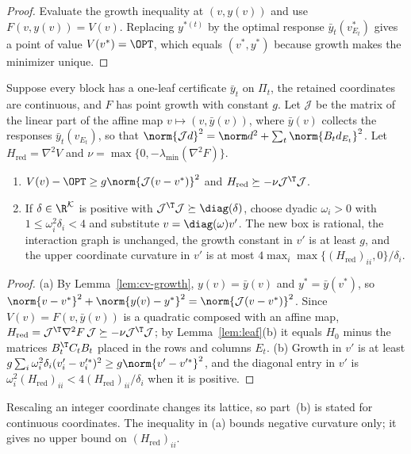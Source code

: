 \begin{proof}
Evaluate the growth inequality at $(v,y(v))$ and use $F(v,y(v))=V(v)$.
Replacing $y^{*(t)}$ by the optimal response $\bar y_t(v^*_{E_t})$ gives a
point of value $V(v^*)=\OPT$, which equals $(v^*,y^*)$ because growth makes
the minimizer unique.
\end{proof}

\begin{corollary}\label{cor:cv-affine}
Suppose every block has a one-leaf certificate $\bar y_t$ on $\Pi_t$, the
retained coordinates are continuous, and $F$ has point growth with
constant $g$. Let $\mathcal J$ be the matrix of the linear part of the affine
map $v\mapsto(v,\bar y(v))$, where $\bar y(v)$ collects the responses
$\bar y_t(v_{E_t})$, so that
$\norm{\mathcal Jd}^2=\norm d^2+\sum_t\norm{B_td_{E_t}}^2$. Let
$H_{\mathrm{red}}=\nabla^2V$ and $\nu=\max\{0,-\lambda_{\min}(\nabla^2F)\}$.
\begin{enumerate}
\item[(a)] $V(v)-\OPT\ge g\norm{\mathcal J(v-v^*)}^2$ and
$H_{\mathrm{red}}\succeq-\nu\mathcal J^{\T}\mathcal J$.
\item[(b)] If $\delta\in\R^{\mathcal K}$ is positive with
$\mathcal J^{\T}\mathcal J\succeq\diag(\delta)$, choose dyadic $\omega_i>0$
with $1\le\omega_i^2\delta_i<4$ and substitute $v=\diag(\omega)v'$. The new
box is rational, the interaction graph is unchanged, the growth constant in
$v'$ is at least $g$, and the upper coordinate curvature in $v'$ is at most
$4\max_i\max\{(H_{\mathrm{red}})_{ii},0\}/\delta_i$.
\end{enumerate}
\end{corollary}

\begin{proof}
(a) By Lemma~\ref{lem:cv-growth}, $y(v)=\bar y(v)$ and $y^*=\bar y(v^*)$,
so $\norm{v-v^*}^2+\norm{y(v)-y^*}^2=\norm{\mathcal J(v-v^*)}^2$. Since
$V(v)=F(v,\bar y(v))$ is a quadratic composed with an affine map,
$H_{\mathrm{red}}=\mathcal J^{\T}\nabla^2F\,\mathcal J\succeq-\nu\mathcal J^{\T}\mathcal J$;
by Lemma~\ref{lem:leaf}(b) it equals $H_0$ minus the matrices
$B_t^{\T}C_tB_t$ placed in the rows and columns $E_t$. (b) Growth in $v'$
is at least $g\sum_i\omega_i^2\delta_i(v'_i-v'^*_i)^2\ge g\norm{v'-v'^*}^2$,
and the diagonal entry in $v'$ is
$\omega_i^2(H_{\mathrm{red}})_{ii}<4(H_{\mathrm{red}})_{ii}/\delta_i$ when it
is positive.
\end{proof}

Rescaling an integer coordinate changes its lattice, so part~(b) is stated
for continuous coordinates. The inequality in (a) bounds negative curvature
only; it gives no upper bound on $(H_{\mathrm{red}})_{ii}$.

